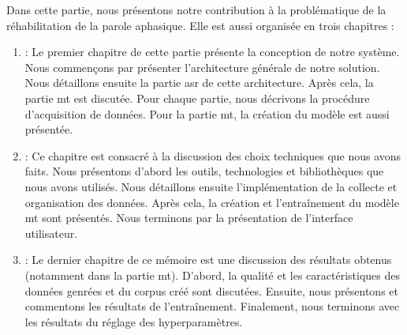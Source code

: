 Dans cette partie, nous présentons notre contribution à la problématique de la réhabilitation de la parole aphasique.
Elle est aussi organisée en trois chapitres :
\begin{enumerate}[label=Chapitre \arabic*,resume]
    \item {} :
    Le premier chapitre de cette partie présente la conception de notre système.
    Nous commençons par présenter l'architecture générale de notre solution.
    Nous détaillons ensuite la partie \gls{asr} de cette architecture.
    Après cela, la partie \gls{mt} est discutée.
    Pour chaque partie, nous décrivons la procédure d'acquisition de données. 
    Pour la partie \gls{mt}, la création du modèle est aussi présentée.
    
    \item {} :
    Ce chapitre est consacré à la discussion des choix techniques que nous avons faits.
    Nous présentons d'abord les outils, technologies et bibliothèques que nous avons utilisés.
    Nous détaillons ensuite l'implémentation de la collecte et organisation des données.
    Après cela, la création et l'entraînement du modèle \gls{mt} sont présentés.
    Nous terminons par la présentation de l'interface utilisateur.
    
    \item {} :
    Le dernier chapitre de ce mémoire est une discussion des résultats obtenus 
    (notamment dans la partie \gls{mt}).
    D'abord, la qualité et les caractéristiques des données genrées et du corpus créé sont discutées.
    Ensuite, nous présentons et commentons les résultats de l'entraînement.
    Finalement, nous terminons avec les résultats du réglage des hyperparamètres.
\end{enumerate}

